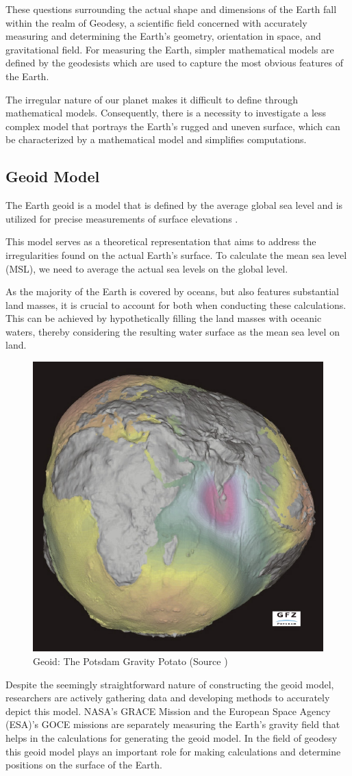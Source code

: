 These questions surrounding the actual shape and dimensions of the Earth fall within the realm of Geodesy, a scientific field concerned with accurately measuring and
determining the Earth's geometry, orientation in space, and gravitational field.
For measuring the Earth, simpler mathematical models are defined by the geodesists which are used to capture the most obvious features of the Earth\cite{GEODESY}.

The irregular nature of our planet makes it difficult to define through mathematical models.
Consequently, there is a necessity to investigate a less complex model that portrays the Earth's rugged and uneven surface, which can be characterized by a mathematical
model and simplifies computations.

\subsection{Geoid Model}
The Earth geoid is a model that is defined by the average global sea level and is utilized for precise measurements of surface elevations \cite{NOAA_GEOID}.

This model serves as a theoretical representation that aims to address the irregularities found on the actual Earth's surface. To calculate the mean sea level (MSL),
we need to average the actual sea levels on the global level.

As the majority of the Earth is covered by oceans, but also features substantial land masses, it is crucial to account for both when conducting these calculations.
This can be achieved by hypothetically filling the land masses with oceanic waters, thereby considering the resulting water surface as the mean sea level on land.
\begin{figure}[H]
    \centering
    \includegraphics[width=0.5\linewidth]{figures/chapter-2/geoid.jpg}
    \caption{Geoid: The Potsdam Gravity Potato (Source \cite{GEOID_IMAGE}) }
    \label{fig:geoid-image}
\end{figure}
Despite the seemingly straightforward nature of constructing the geoid model, researchers are actively gathering data and developing methods to accurately depict this model.
NASA's GRACE Mission and the European Space Agency (ESA)'s GOCE missions are separately measuring the Earth's gravity field that helps in the calculations for generating the geoid model.
In the field of geodesy this geoid model plays an important role for making calculations and determine positions on the surface of the Earth.

